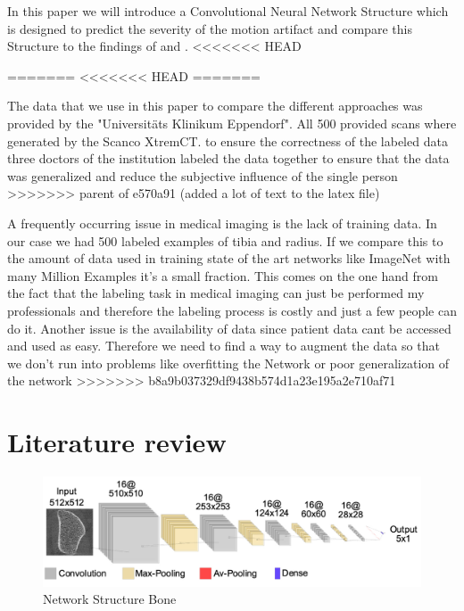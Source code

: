 \documentclass[
a4paper, 
12pt,
grayscalebody, %
abstract=on,
twoside, BCOR10mm, 12pt, DIV13,headinclude, footexclude, final, abstracton, openright
]{ibireprt}
\numberwithin{equation}{chapter}
\numberwithin{table}{chapter}
\numberwithin{figure}{chapter}
\numberwithin{algorithm}{chapter}
\numberwithin{example}{chapter}
\numberwithin{example}{chapter}
\begin{document}
In this paper we will introduce a Convolutional Neural Network Structure which is designed to predict the severity of the motion artifact and compare this Structure to the findings of \cite{Sode2011} and \cite{Walle2023}. 
<<<<<<< HEAD





=======
<<<<<<< HEAD
=======

The data that we use in this paper to compare the different approaches was provided by the "Universitäts Klinikum Eppendorf". All 500 provided scans where generated by the Scanco XtremCT.%
to ensure the correctness of the labeled data three doctors of the institution labeled the data together to ensure that the data was generalized and reduce the subjective influence of the single person  
>>>>>>> parent of e570a91 (added a lot of text to the latex file)


A frequently occurring issue in medical imaging is the lack of training data. In our case we had 500 labeled examples of tibia and radius. If we compare this to the amount of data used in training state of the art networks like ImageNet with many Million Examples it's a small fraction. This comes on the one hand from the fact that the labeling task in medical imaging can just be performed my professionals and therefore the labeling process is costly and just a few people can do it. Another issue is the availability of data since patient data cant be accessed and used as easy. Therefore we need to find a way to augment the data so that we don't run into problems like overfitting the Network or poor generalization of the network
>>>>>>> b8a9b037329df9438b574d1a23e195a2e710af71
\chapter{Literature review}

\begin{figure}[h]	
	\center
	\includegraphics[width = 1 \textwidth]{Bone_Network_Structure.png}%
	\caption{Network Structure Bone}
	\label{fig:fig1}
\end{figure}%
\end{document}
